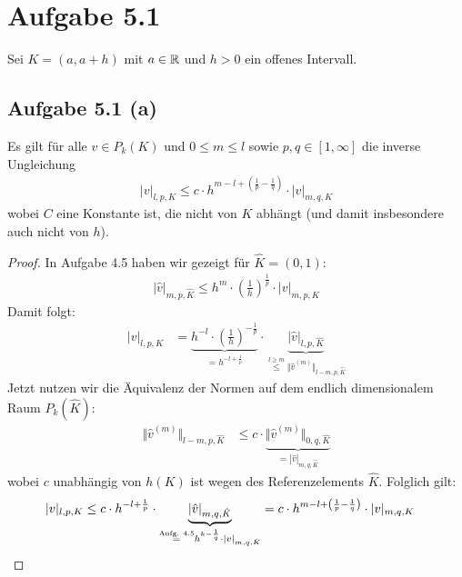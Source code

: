 \documentclass[12pt,a4paper]{article}
\author{Willi Sontopski}
\begin{document}

\section*{Aufgabe 5.1}
Sei $K=(a,a+h)$ mit $a\in\mathbb{R}$ und $h>0$ ein offenes Intervall.

\subsection*{Aufgabe 5.1 (a)}
Es gilt für alle $v\in P_k(K)$ und $0\leq m\leq l$ sowie $p,q\in[1,\infty]$ die inverse Ungleichung
\begin{align*}
|v|_{l,p,K}\leq c\cdot h^{m-l+\left(\frac{1}{p}-\frac{1}{q}\right)}\cdot|v|_{m,q,K}
\end{align*}
wobei $C$ eine Konstante ist, die nicht von $K$ abhängt (und damit insbesondere auch nicht von $h$).

\begin{proof}
In Aufgabe 4.5 haben wir gezeigt für $\hat{K}=(0,1)$:
\begin{align*}
|\hat{v}|_{m,p,\hat{K}}\leq h^m\cdot\left(\frac{1}{h}\right)^{\frac{1}{p}}\cdot|v|_{m,p,K}
\end{align*}
Damit folgt:
\begin{align*}
|v|_{l,p,K}
&=\underbrace{h^{-l}\cdot\left(\frac{1}{h}\right)^{-\frac{1}{p}}}_{=h^{-l+\frac{1}{p}}}\cdot\underbrace{|\hat{v}|_{l,p,\hat{K}}}_{\stackrel{l\geq m}{\leq}\Vert \hat{v}^{(m)}\Vert_{l-m,p,\hat{K}}}
\end{align*}
Jetzt nutzen wir die Äquivalenz der Normen auf dem endlich dimensionalem Raum $P_k(\hat{K})$:
\begin{align*}
\Vert \hat{v}^{(m)}\Vert_{l-m,p,\hat{K}}
&\leq
c\cdot\underbrace{\Vert\hat{v}^{(m)}\Vert_{0,q,\hat{K}}}_{=|\hat{v}|_{m,q,\hat{K}}}
\end{align*}
wobei $c$ unabhängig von $h(K)$ ist wegen des Referenzelements $\hat{K}$. Folglich gilt:
\begin{align*}
|v|_{l,p,K}
&\leq
c\cdot h^{-l+\frac{1}{p}}\cdot\underbrace{|\hat{v}|_{m,q,\hat{K}}}_{\stackrel{\text{Aufg. 4.5}}{=}h^{k-\frac{1}{q}}\cdot|v|_{m,q,\hat{K}}}
=c\cdot h^{m-l+\left(\frac{1}{p}-\frac{1}{q}\right)}\cdot|v|_{m,q,K}
\end{align*}
\end{proof}
\end{document}
